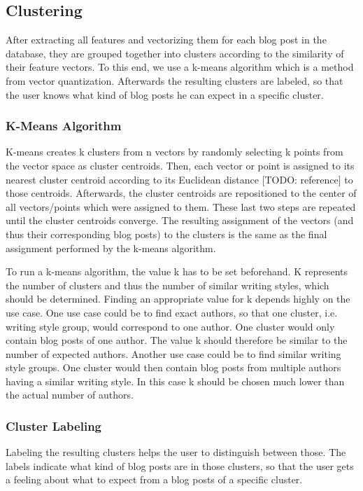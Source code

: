 \subsection{Clustering}
\label{sec:clustering}

After extracting all features and vectorizing them for each blog post in the database, they are grouped together into clusters according to the similarity of their feature vectors.
To this end, we use a k-means algorithm which is a method from vector quantization.
Afterwards the resulting clusters are labeled, so that the user knows what kind of blog posts he can expect in a specific cluster.

\subsubsection{K-Means Algorithm}
\label{sec:k-means}
K-means creates k clusters from n vectors by randomly selecting k points from the vector space as cluster centroids.
Then, each vector or point is assigned to its nearest cluster centroid according to its Euclidean distance [TODO: reference] to those centroids.
Afterwards, the cluster centroids are repositioned to the center of all vectors/points which were assigned to them.
These last two steps are repeated until the cluster centroids converge.
The resulting assignment of the vectors (and thus their corresponding blog posts) to the clusters is the same as the final assignment performed by the k-means algorithm.

To run a k-means algorithm, the value k has to be set beforehand.
K represents the number of clusters and thus the number of similar writing styles, which should be determined.
Finding an appropriate value for k depends highly on the use case.
One use case could be to find exact authors, so that one cluster, i.e. writing style group, would correspond to one author.
One cluster would only contain blog posts of one author.
The value k should therefore be similar to the number of expected authors.
Another use case could be to find similar writing style groups.
One cluster would then contain blog posts from multiple authors having a similar writing style.
In this case k should be chosen much lower than the actual number of authors.


\subsubsection{Cluster Labeling}
\label{sec:cluster_labeling}
Labeling the resulting clusters helps the user to distinguish between those.
The labels indicate what kind of blog posts are in those clusters, so that the user gets a feeling about what to expect from a blog posts of a specific cluster.

